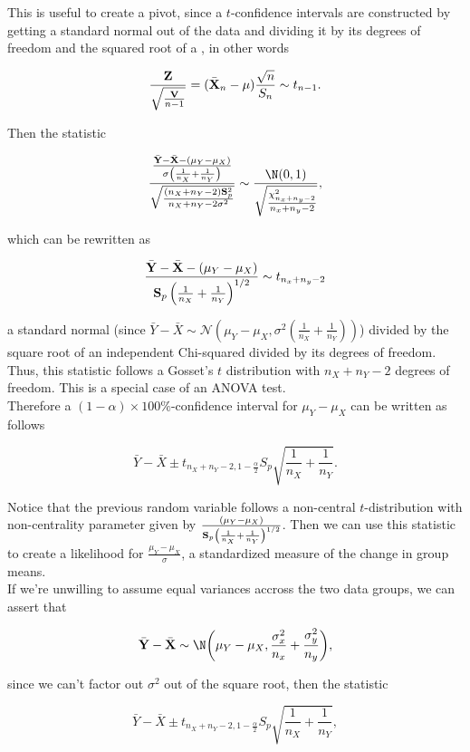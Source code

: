 \documentclass{homework}
\begin{document}
This is useful to create a pivot, since a $t$-confidence intervals are constructed by getting a standard normal out of the data and dividing it by its degrees of freedom and the squared root of a \chidis, in other words

$$
\frac{{\bf Z}}{\sqrt{\frac{{\bf V}}{n-1}}} =  (\bar{{\bf X}}_n - \mu) \frac{\sqrt{n}}{S_n} \sim t_{n-1}.
$$

Then the statistic 

$$
\frac{\frac{\bar{{\bf Y}}-\bar{{\bf X}} - (\mu_Y-\mu_X) }{\sigma\left(\frac{1}{n_X}+\frac{1}{n_Y}\right)}}{\sqrt{\frac{(n_X+n_Y-2){\bf S}_p^2}{n_X+n_Y-2\sigma^2}}} \sim \frac{\N(0,1)}{\sqrt{\frac{\chi^2_{n_x+n_y-2}}{{n_x+n_y-2}}}},
$$

which can be rewritten as 

$$
 \frac{\bar{{\bf Y}}-\bar{{\bf X}}- (\mu_Y-\mu_X)}{{\bf S}_p \left(\frac{1}{n_X}+\frac{1}{n_Y}\right)^{1/2}} \sim t_{n_x+n_y-2}
$$


a standard normal (since $\bar{Y}-\bar{X} \sim \mathcal{N}\left(\mu_{Y}-\mu_{X},\sigma^2 \left(\frac{1}{n_X}+\frac{1}{n_Y}\right)\right)$) divided by  the square root of an independent Chi-squared divided by its degrees of freedom. Thus, this statistic follows a Gosset's $t$ distribution with $n_X+n_Y-2$ degrees of freedom. This is a special case of an ANOVA test. \\

Therefore a $(1-\alpha)\times 100\%$-confidence interval for $\mu_Y-\mu_X$ can be written as follows

$$
\bar{Y}-\bar{X}\pm t_{n_{X}+n_{Y}-2,1-\frac{\alpha}{2}}S_p \sqrt{\frac{1}{n_X}+\frac{1}{n_Y}}.
$$

Notice that the previous random variable follows a non-central $t$-distribution with non-centrality parameter given by $ \frac{(\mu_Y-\mu_X)}{{\bf S}_p \left(\frac{1}{n_X}+\frac{1}{n_Y}\right)^{1/2}}$. Then we can use this statistic to create a likelihood for $\frac{\mu_Y-\mu_X}{\sigma}$, a standardized measure of the change in group means. \\

If we're unwilling to assume equal variances accross the two data groups, we can assert that 

$$
\bar{{\bf Y}}-\bar{{\bf X}} \sim \N\bigg(\mu_Y-\mu_X, \frac{\sigma^2_x}{n_x}+\frac{\sigma^2_y}{n_y}\bigg),
$$

since we can't factor out $\sigma^2$ out of the square root, then the statistic

$$
\bar{Y}-\bar{X}\pm t_{n_{X}+n_{Y}-2,1-\frac{\alpha}{2}}S_p \sqrt{\frac{1}{n_X}+\frac{1}{n_Y}},
$$
\end{document}
